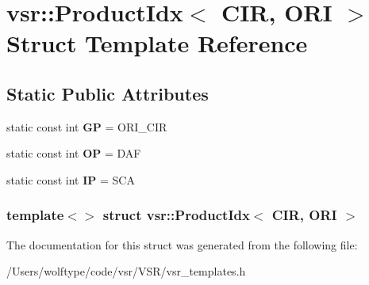 \hypertarget{structvsr_1_1_product_idx_3_01_c_i_r_00_01_o_r_i_01_4}{\section{vsr\-:\-:Product\-Idx$<$ C\-I\-R, O\-R\-I $>$ Struct Template Reference}
\label{structvsr_1_1_product_idx_3_01_c_i_r_00_01_o_r_i_01_4}
}
\subsection*{Static Public Attributes}
\begin{DoxyCompactItemize}
\item 
\hypertarget{structvsr_1_1_product_idx_3_01_c_i_r_00_01_o_r_i_01_4_a1fa6ace65ca861051d745083561f1586}{static const int {\bfseries G\-P} = O\-R\-I\-\_\-\-C\-I\-R}\label{structvsr_1_1_product_idx_3_01_c_i_r_00_01_o_r_i_01_4_a1fa6ace65ca861051d745083561f1586}

\item 
\hypertarget{structvsr_1_1_product_idx_3_01_c_i_r_00_01_o_r_i_01_4_a7b8ed06fd0f0bfa7de92570672cd9a96}{static const int {\bfseries O\-P} = D\-A\-F}\label{structvsr_1_1_product_idx_3_01_c_i_r_00_01_o_r_i_01_4_a7b8ed06fd0f0bfa7de92570672cd9a96}

\item 
\hypertarget{structvsr_1_1_product_idx_3_01_c_i_r_00_01_o_r_i_01_4_aca9aadb950e8ec692ef92d1732459302}{static const int {\bfseries I\-P} = S\-C\-A}\label{structvsr_1_1_product_idx_3_01_c_i_r_00_01_o_r_i_01_4_aca9aadb950e8ec692ef92d1732459302}

\end{DoxyCompactItemize}
\subsubsection*{template$<$$>$ struct vsr\-::\-Product\-Idx$<$ C\-I\-R, O\-R\-I $>$}



The documentation for this struct was generated from the following file\-:\begin{DoxyCompactItemize}
\item 
/\-Users/wolftype/code/vsr/\-V\-S\-R/vsr\-\_\-templates.\-h\end{DoxyCompactItemize}
